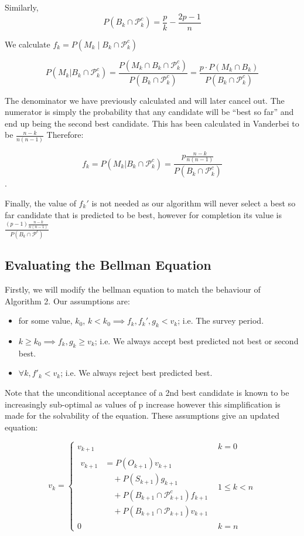 \documentclass[a4paper,11pt]{article}
\begin{document}
Similarly, 
$$
P(B_{k} \cap \mathcal{P}_{k}^c) = \frac{p}{k} - \frac{2p-1}{n} 
$$

We calculate $f_k = P(M_k \mid B_k\cap \mathcal{P}^c_k )$

$$
P(M_k| B_k\cap \mathcal{P}^c_k ) = \frac{P(M_k\cap B_k\cap \mathcal{P}^c_k )}{P(B_k\cap \mathcal{P}^c_k)} = \frac{p \cdot P(M_k\cap B_k )}{P(B_k\cap \mathcal{P}^c_k)}
$$

The denominator we have previously calculated and will later cancel out. The numerator is simply the probability that any candidate will be ``best so far'' and end up being the second best candidate. This has been calculated in Vanderbei to be $\frac{n-k}{n(n-1)}$ Therefore:

$$
f_k=P(M_k| B_k\cap \mathcal{P}^c_k ) = \frac{p\frac{n-k}{n(n-1)}}{P(B_k\cap \mathcal{P}^c_k)}
$$.

Finally, the value of $f_k'$ is not needed as our algorithm will never select a best so far candidate that is predicted to be best, however for completion its value is $\frac{(p-1)\frac{n-k}{n(n-1)}}{P(B_k\cap \mathcal{P}^c)}$
\subsection{Evaluating the Bellman Equation}
\label{sec:ninetwo}
Firstly, we will modify the bellman equation to match the behaviour of Algorithm 2. Our assumptions are:
\begin{itemize}
    \item for some value, $k_0$, $k < {k_0} \implies f_k, f_k', g_k < v_k$; i.e. The survey period.
    \item $k \ge k_0 \implies f_k, g_k \ge v_k$; i.e. We always accept best predicted not best or second best.
    \item $\forall k, f'_k<v_k$; i.e. We always reject best predicted best.
\end{itemize}

Note that the unconditional acceptance of a 2nd best candidate is known to be increasingly sub-optimal as values of p increase however this simplification is made for the solvability of the equation. These assumptions give an updated equation:

$$
v_k = \begin{cases}
  v_{k+1} & k = 0\\
\begin{aligned}
v_{k+1} &= P(O_{k+1}) v_{k+1} \\
      &\quad + P(S_{k+1})g_{k+1} \\
      &\quad + P(B_{k+1} \cap \mathcal{P}_{k+1}^c)f_{k+1} \\
      &\quad + P(B_{k+1} \cap \mathcal{P}_{k+1})v_{k+1}
\end{aligned} & 1\le k < n\\
 0 & k = n
\end{cases}
$$
\end{document}
